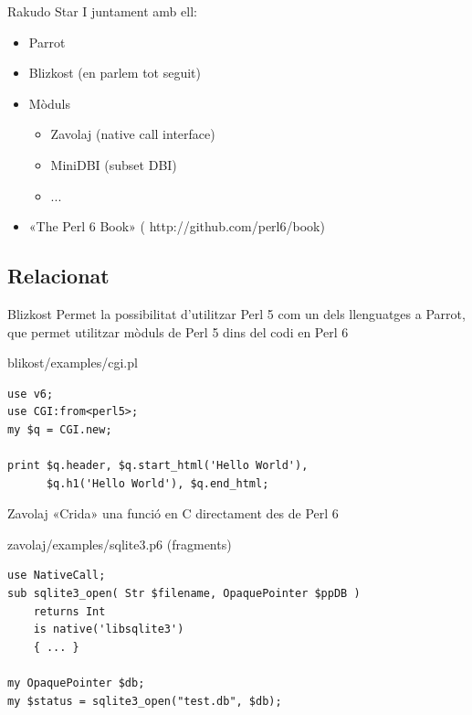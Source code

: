 \documentclass{beamer}
\begin{document}
\begin{frame}{Rakudo Star}
	I juntament amb ell:
	\begin{itemize}
		\item Parrot
		\item Blizkost (en parlem tot seguit)
		\item Mòduls
		\begin{itemize}
			\item Zavolaj (native call interface)
			\item MiniDBI (subset DBI)
			\item ...
		\end{itemize}
	\item «The Perl 6 Book»
		(
		{http://github.com/perl6/book})
	\end{itemize}
\end{frame}

			\subsection{Relacionat}
\begin{frame}[fragile]{Blizkost}
	Permet la possibilitat d'utilitzar Perl 5 com un dels llenguatges
    a Parrot, que permet utilitzar mòduls de Perl 5 dins del codi
    en Perl 6
	\begin{block}{blikost/examples/cgi.pl}
\begin{verbatim}
use v6;
use CGI:from<perl5>;
my $q = CGI.new;

print $q.header, $q.start_html('Hello World'),
      $q.h1('Hello World'), $q.end_html;
\end{verbatim}
	\end{block}
\end{frame}

\begin{frame}[fragile]{Zavolaj}
	«Crida» una funció en C directament des de Perl 6
	\begin{block}{zavolaj/examples/sqlite3.p6 (fragments)}
\begin{verbatim}
use NativeCall;
sub sqlite3_open( Str $filename, OpaquePointer $ppDB )
    returns Int
    is native('libsqlite3')
    { ... }

my OpaquePointer $db;
my $status = sqlite3_open("test.db", $db);
\end{verbatim}
	\end{block}
\end{frame}
\end{document}
